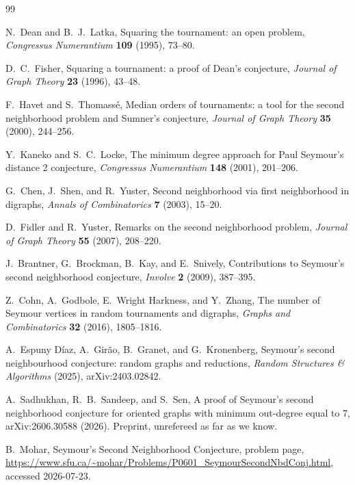 \documentclass[11pt]{article}
\begin{document}
\begin{thebibliography}{99}

 N.~Dean and B.~J.~Latka, Squaring the tournament: an
open problem, \emph{Congressus Numerantium} \textbf{109} (1995), 73--80.

 D.~C.~Fisher, Squaring a tournament: a proof of Dean's
conjecture, \emph{Journal of Graph Theory} \textbf{23} (1996), 43--48.

 F.~Havet and S.~Thomass\'e, Median orders of
tournaments: a tool for the second neighborhood problem and Sumner's
conjecture, \emph{Journal of Graph Theory} \textbf{35} (2000), 244--256.

 Y.~Kaneko and S.~C.~Locke, The minimum degree
approach for Paul Seymour's distance 2 conjecture, \emph{Congressus
Numerantium} \textbf{148} (2001), 201--206.

 G.~Chen, J.~Shen, and R.~Yuster, Second
neighborhood via first neighborhood in digraphs, \emph{Annals of
Combinatorics} \textbf{7} (2003), 15--20.

 D.~Fidler and R.~Yuster, Remarks on the second
neighborhood problem, \emph{Journal of Graph Theory} \textbf{55} (2007),
208--220.

 J.~Brantner, G.~Brockman, B.~Kay, and E.~Snively,
Contributions to Seymour's second neighborhood conjecture, \emph{Involve}
\textbf{2} (2009), 387--395.

 Z.~Cohn, A.~Godbole, E.~Wright Harkness, and
Y.~Zhang, The number of Seymour vertices in random tournaments and
digraphs, \emph{Graphs and Combinatorics} \textbf{32} (2016), 1805--1816.

 A.~Espuny D\'iaz, A.~Gir\~ao, B.~Granet, and
G.~Kronenberg, Seymour's second neighbourhood conjecture: random graphs
and reductions, \emph{Random Structures \& Algorithms} (2025),
arXiv:2403.02842.

 A.~Sadhukhan, R.~B.~Sandeep, and S.~Sen,
A proof of Seymour's second neighborhood conjecture for oriented graphs
with minimum out-degree equal to 7, arXiv:2606.30588 (2026). Preprint,
unrefereed as far as we know.

 B.~Mohar, Seymour's Second Neighborhood Conjecture,
problem page,
\url{https://www.sfu.ca/~mohar/Problems/P0601_SeymourSecondNbdConj.html},
accessed 2026-07-23.


\end{thebibliography}
\end{document}
